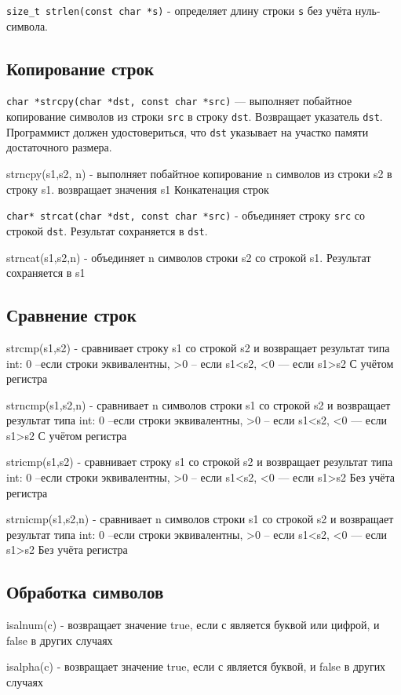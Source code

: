 \documentclass[14pt, a4paper]{extarticle}
\begin{document}
\verb|size_t strlen(const char *s)| - определяет длину строки \verb|s| без учёта нуль-символа.

\subsection*{Копирование строк}

\verb|char *strcpy(char *dst, const char *src)| --- выполняет побайтное копирование символов из строки \verb|src|
в строку \verb|dst|. Возвращает указатель \verb|dst|. Программист должен удостовериться, что \verb|dst| указывает
на участко памяти достаточного размера.

strncpy(s1,s2, n) - выполняет побайтное копирование n символов из строки  s2 в строку s1. возвращает значения s1
Конкатенация строк

\verb|char* strcat(char *dst, const char *src)| - объединяет строку \verb|src| со строкой \verb|dst|.
Результат сохраняется в \verb|dst|. 

strncat(s1,s2,n) - объединяет n символов строки s2 со строкой s1. Результат сохраняется в s1
\subsection*{Сравнение строк}

strcmp(s1,s2) - сравнивает строку s1 со строкой s2 и возвращает результат типа int:
0 –если строки эквивалентны, >0 – если s1<s2,  <0  — если s1>s2 С учётом регистра

strncmp(s1,s2,n) - сравнивает n символов строки s1 со строкой s2 и возвращает результат типа int:
0 –если строки эквивалентны, >0 – если s1<s2,  <0  — если s1>s2 С учётом регистра

stricmp(s1,s2) - сравнивает строку s1 со строкой s2 и возвращает результат типа int:
0 –если строки эквивалентны, >0 – если s1<s2,  <0  — если s1>s2 Без учёта регистра

strnicmp(s1,s2,n) - сравнивает n символов строки s1 со строкой s2 и возвращает результат типа int:
0 –если строки эквивалентны, >0 – если s1<s2,  <0 — если s1>s2 Без учёта регистра
\subsection*{Обработка символов}

isalnum(c) - возвращает значение true, если с является буквой или цифрой, и false в других случаях

isalpha(c) - возвращает значение true, если с является буквой,  и false в других случаях
\end{document}
